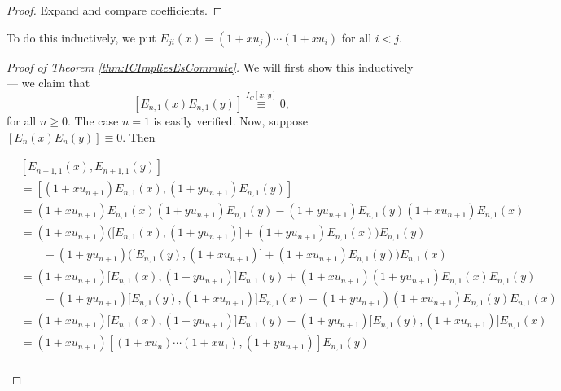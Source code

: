 \documentclass{article}
\begin{document}
\begin{proof}
    Expand and compare coefficients.
\end{proof}

To do this inductively, we put $E_{ji}(x) = (1+xu_j) \cdots (1+xu_i)$ for all $i < j$.

\begin{proof}
    [Proof of Theorem \ref{thm:ICImpliesEsCommute}]

    We will first show this inductively--- we claim that
    \[
        [E_{n,1}(x)E_{n,1}(y)]
        \overset{I_C[x,y]}{\equiv}
        0,
    \]
    for all $n \geq 0$.
    The case $n=1$ is easily verified.
    Now, suppose $[E_n(x)E_n(y)] \equiv 0$.
    Then
    \begin{landscape}
        \begin{align*}
            &[E_{n+1,1}(x),E_{n+1,1}(y)]
            \\
            &=
            \left[
                (1+xu_{n+1})E_{n,1}(x),
                (1+yu_{n+1})E_{n,1}(y)
            \right]
            \\
            &=
            (1+xu_{n+1})E_{n,1}(x)(1+yu_{n+1})E_{n,1}(y)
            -(1+yu_{n+1})E_{n,1}(y)(1+xu_{n+1})E_{n,1}(x)
            \\
            &=
            (1+xu_{n+1})
            \Big(
                \big[E_{n,1}(x),(1+yu_{n+1})\big]
                + (1+yu_{n+1})E_{n,1}(x)
            \Big)
            E_{n,1}(y)
            \\
            &\qquad-
            (1+yu_{n+1})
            \Big(
                \big[E_{n,1}(y),(1+xu_{n+1})\big]
                + (1+xu_{n+1})E_{n,1}(y)
            \Big)
            E_{n,1}(x)
            \\
            &=
            (1+xu_{n+1})\big[E_{n,1}(x),(1+yu_{n+1})\big]E_{n,1}(y)
            + (1+xu_{n+1})(1+yu_{n+1})E_{n,1}(x)E_{n,1}(y)
            \\
            &\qquad-
            (1+yu_{n+1})\big[E_{n,1}(y),(1+xu_{n+1})\big]E_{n,1}(x)
            - (1+yu_{n+1})(1+xu_{n+1})E_{n,1}(y)E_{n,1}(x)
            \\
            &\equiv
            (1+xu_{n+1})\big[E_{n,1}(x),(1+yu_{n+1})\big]E_{n,1}(y)
            - (1+yu_{n+1})\big[E_{n,1}(y),(1+xu_{n+1})\big]E_{n,1}(x)
            \\
            &=
            (1+xu_{n+1})
            \left[
                (1+xu_n)\cdots(1+xu_1),(1+yu_{n+1})
            \right]
            E_{n,1}(y)
            \\

\end{align*}
\end{landscape}
\end{proof}
\end{document}
